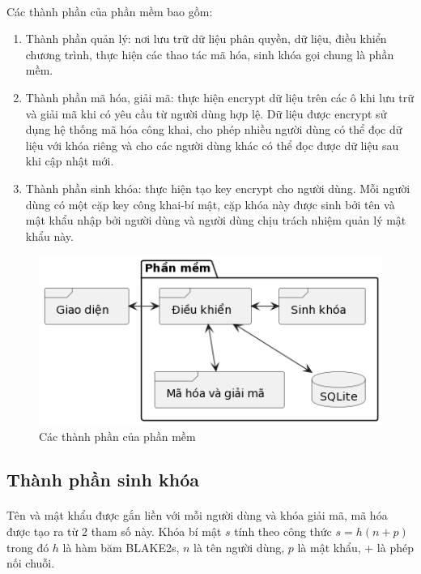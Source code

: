 \paragraph{}
Các thành phần của phần mềm bao gồm:
\begin{enumerate}
	\item Thành phần quản lý: nơi lưu trữ dữ liệu phân quyền, dữ liệu, điều khiển chương trình, thực hiện các thao tác mã hóa, sinh khóa gọi chung là phần mềm.
	\item Thành phần mã hóa, giải mã: thực hiện \gls{encrypt} dữ liệu trên các ô khi lưu trữ và giải mã khi có yêu cầu từ người dùng hợp lệ. Dữ liệu được \gls{encrypt} sử dụng hệ thống mã hóa công khai, cho phép nhiều người dùng có thể đọc dữ liệu với khóa riêng và cho các người dùng khác có thể đọc được dữ liệu sau khi cập nhật mới.
	\item Thành phần sinh khóa: thực hiện tạo \gls{key} \gls{encrypt} cho người dùng. Mỗi người dùng có một cặp \gls{key} công khai-bí mật, cặp khóa này được sinh bởi tên và mật khẩu nhập bởi người dùng và người dùng chịu trách nhiệm quản lý mật khẩu này.
\end{enumerate}
\begin{figure}[H]
	\centering
	\includegraphics{images/component-diagram.png}
	\caption{Các thành phần của phần mềm}
\end{figure}

\subsection{Thành phần sinh khóa}

\paragraph{}
Tên và mật khẩu được gắn liền với mỗi người dùng và khóa giải mã, mã hóa được tạo ra từ 2 tham số này. Khóa bí mật $s$ tính theo công thức $s=h(n+p)$ trong đó $h$ là hàm băm BLAKE2s, $n$ là tên người dùng, $p$ là mật khẩu, + là phép nối chuỗi.

